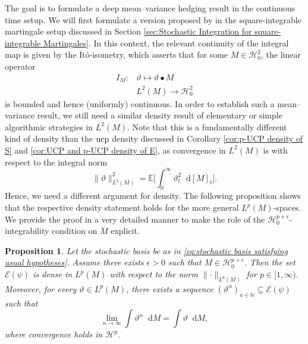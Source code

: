 \documentclass[11pt,a4paper,twoside,openany]{report}
\numberwithin{equation}{section}
\newcommand{\diff}{\mathop{}\!\mathrm{d}}
\theoremstyle{plain} %
\newtheorem{proposition}[theorem]{Proposition}
\theoremstyle{definition} %
\theoremstyle{remark} %
\let\parencite\authnumparencite
\begin{document}
The goal is to formulate a deep mean--variance hedging result in the continuous time setup. We will first formulate a version proposed by \parencite{Arandjelovic2025} in the square-integrable martingale setup discussed in Section \ref{sec:Stochastic Integration for square-integrable Martingales}. In this context, the relevant continuity of the integral map is given by the Itô-isometry, which asserts that for some \(M\in\mathcal{H}_0^2\), the linear operator
\begin{align*}
    I_M:& \vartheta\mapsto \vartheta\bullet M\\
    &L^2(M)\to \mathcal{H}_0^2
\end{align*}
is bounded and hence (uniformly) continuous. In order to establish such a mean--variance result, we still need a similar density result of elementary or simple algorithmic strategies in \(L^2(M)\). Note that this is a fundamentally different kind of density than the \(\rm{ucp}\) density discussed in Corollary \ref{cor:p-UCP density of S} and \ref{cor:UCP and p-UCP density of E}, as convergence in \(L^2(M)\) is with respect to the integral norm 
\begin{equation*}
    \lVert \vartheta\rVert_{L^2(M)}^2=\mathbb{E}\bigg[\int_0^{\infty} \vartheta_t^2\diff [M]_t\bigg].
\end{equation*}
Hence, we need a different argument for density. The following proposition shows that the respective density statement holds for the more general \(L^p(M)\)-spaces. We provide the proof in a very detailed manner to make the role of the \(\mathcal{H}^{p+\epsilon}_0\)-integrability condition on \(M\) explicit.
\begin{proposition}\label{prop:Lp(M) density of E(psi)}
    Let the stochastic basis be as in \eqref{eq:stochastic basis satisfying usual hypotheses}. Assume there exists \(\epsilon>0\) such that \(M\in\mathcal{H}_0^{p+\epsilon}\). Then the set \(\mathcal{E}(\psi)\) is dense in \(L^p(M)\) with respect to the norm \(\lVert\cdot\rVert_{L^p(M)}\) for \(p\in[1,\infty)\). Moreover, for every \(\vartheta\in L^p(M)\), there exists a sequence \((\vartheta^n)_{n\in\mathbb{N}}\subseteq\mathcal{E}(\psi)\) such that
    \begin{equation}\label{eq:elementary integrals converge}
        \lim_{n\to\infty}\int \vartheta^n\diff M=\int \vartheta\diff M,
    \end{equation}
    where convergence holds in \(\mathcal{H}^p\). 
\end{proposition}
\end{document}
